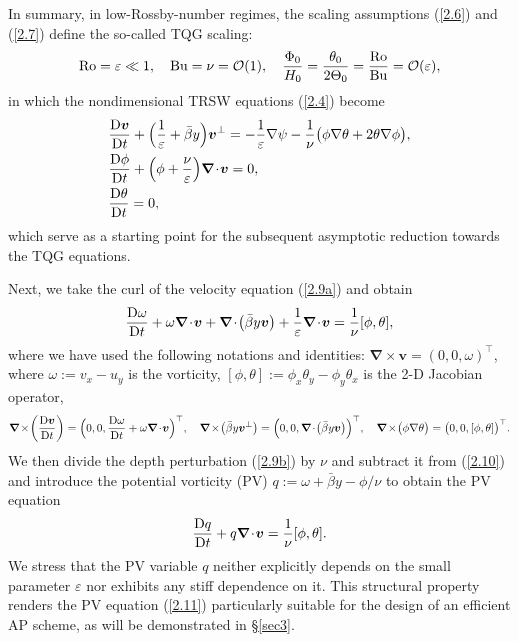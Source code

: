 \documentclass[a4paper,11pt,twoside]{article}
\numberwithin{equation}{section}
\numberwithin{figure}{section}
\numberwithin{table}{section}
\newcommand{\bnabla}{\bm{\nabla}}
\newcommand{\eps}{\varepsilon}
\newcommand{\bv}{\bm{v}}
\newcommand{\Ro}{\mathrm{Ro}}
\newcommand{\Bu}{\mathrm{Bu}}
\newcommand\eref[1]{(\ref{#1})}
\begin{document}
In summary, in low-Rossby-number regimes, the scaling assumptions \eref{2.6} and \eref{2.7} define the so-called TQG scaling:
\begin{equation}
\Ro=\eps\ll1,\quad\Bu=\nu={\cal O}(1),\quad\frac{\Phi_0}{H_0}=\frac{\theta_0}{2\Theta_0}=\frac{\Ro}{\Bu}={\cal O}(\eps),
\label{2.8}
\end{equation}
in which the nondimensional TRSW equations \eref{2.4} become
\begin{subequations}
\begin{align}
&\frac{{\rm D}\bv}{{\rm D}t}+\Big(\frac{1}{\eps}+\bar\beta y\Big)\bv^\perp=-\frac{1}{\eps}\nabla\psi-
\frac{1}{\nu}\big(\phi\nabla\theta+2\theta\nabla\phi\big),\label{2.9a}\\
&\frac{{\rm D}\phi}{{\rm D}t}+\Big(\phi+\frac{\nu}{\eps}\Big)\bnabla\!\cdot\!\bv=0,\label{2.9b}\\
&\frac{{\rm D}\theta}{{\rm D}t}=0,\label{2.9c}
\end{align}
\label{2.9}
\end{subequations}
which serve as a starting point for the subsequent asymptotic reduction towards the TQG equations.

Next, we take the curl of the velocity equation \eref{2.9a} and obtain
\begin{equation}
\frac{{\rm D}\omega}{{\rm D}t}+\omega\bnabla\!\cdot\!\bv+\bnabla\!\cdot\!\big(\bar\beta y\bv\big)+\frac{1}{\eps}\bnabla\!\cdot\!\bv=
\frac{1}{\nu}[\phi,\theta],
\label{2.10}
\end{equation}
where we have used the following notations and identities: $\bnabla\!\times\!\bv=(0,0,\omega)^\top$, where $\omega:=v_x-u_y$ is the
vorticity, $[\phi,\theta]:=\phi_x\theta_y-\phi_y\theta_x$ is the 2-D Jacobian operator,
\begin{equation*}
\bnabla\!\times\!\bigg(\frac{{\rm D}\bv}{{\rm D}t}\bigg)=\Big(0,0,\frac{{\rm D}\omega}{{\rm D}t}+\omega\bnabla\!\cdot\!\bv\Big)^\top,\quad
\bnabla\!\times\!\big(\bar{\beta}y\bv^\perp\big)=\Big(0,0,\bnabla\!\cdot\!\big(\bar\beta y\bv\big)\Big)^\top,\quad
\bnabla\!\times\!\big(\phi\nabla\theta\big)=\big(0,0,[\phi,\theta]\big)^\top.
\end{equation*}
We then divide the depth perturbation \eref{2.9b} by $\nu$ and subtract it from \eref{2.10} and introduce the potential vorticity (PV) 
$q:=\omega+\bar\beta y-\phi/\nu$ to obtain the PV equation
\begin{equation}
\frac{{\rm D}q}{{\rm D}t}+q\bnabla\!\cdot\!\bv=\frac{1}{\nu}[\phi,\theta].
\label{2.11}
\end{equation}
We stress that the PV variable $q$ neither explicitly depends on the small parameter $\eps$ nor exhibits any stiff dependence on it. This 
structural property renders the PV equation \eref{2.11} particularly suitable for the design of an efficient AP scheme, as will be
demonstrated in \S\ref{sec3}. 
\end{document}
